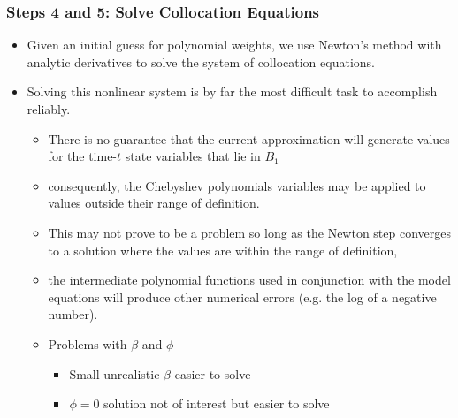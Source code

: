 \documentclass[handout]{beamer}
\begin{document}
\begin{frame}

\frametitle{Steps 4 and 5: Solve Collocation Equations}
\begin{itemize}
\item Given an initial guess for polynomial weights, we use Newton's
  method with analytic derivatives to solve the system of collocation
  equations.
\item Solving this nonlinear system is by far the most difficult task
  to accomplish reliably.
  \begin{itemize}
  \item There is no guarantee that the current approximation will
    generate values for the time-$t$ state variables that lie in
    $B_{1}$
  \item consequently, the Chebyshev polynomials variables may be
    applied to values outside their range of definition.
  \item This may not prove to be a problem so long as the Newton step
    converges to a solution where the values are within the range of
    definition,
  \item the intermediate polynomial functions used %
    {in conjunction} with the model equations will produce other
    numerical errors (e.g. the log of a negative number).
  \item {Problems with $\beta$ and $\phi$}
    \begin{itemize}
    \item Small unrealistic $\beta$ easier to solve
    \item $\phi=0$ solution not of interest but easier to solve
    \end{itemize}
  \end{itemize}
\end{itemize}



\end{frame}
\end{document}
